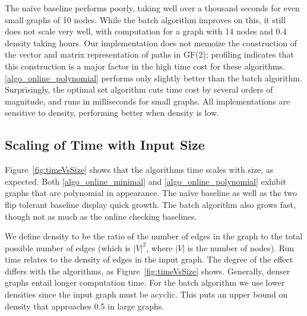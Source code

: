 \documentclass[sigplan,review,nonacm=true]{acmart}
\begin{document}
{The na\"{i}ve baseline performs poorly, taking well over a thousand seconds for even small graphs of 10 nodes.
While the batch algorithm improves on this, it still does not scale very well, with computation for a graph with 14 nodes and 0.4 density taking hours.
Our implementation does not memoize the construction of the vector and matrix representation of paths in GF(2); profiling indicates that this construction is a major factor in the high time cost for these algorithms.
\ref{algo_online_polynomial} performs only slightly better than the batch algorithm.
Surprisingly, the optimal set algorithm cuts time cost by several orders of magnitude, and runs in milliseconds for small graphs.
All implementations are sensitive to density, performing better when density is low.
    
\subsection{Scaling of Time with Input Size}

Figure~\ref{fig:timeVsSize} shows that the algorithms time scales with size, as expected.
Both \ref{algo_online_minimal} and \ref{algo_online_polynomial} exhibit graphs that are polynomial in appearance.
The na\"{i}ve baseline as well as the two flip tolerant baseline display quick growth.
The batch algorithm also grows fast, though not as much as the online checking baselines.

We define density to be the ratio of the number of edges in the graph to the total possible number of edges (which is $|V|^2$, where $|V|$ is the number of nodes).
Run time relates to the density of edges in the input graph.
The degree of the effect differs with the algorithms, as Figure~\ref{fig:timeVsSize} shows.
Generally, denser graphs entail longer computation time.
For the batch algorithm we use lower densities since the input graph must be acyclic. This puts an upper bound on density that approaches 0.5 in large graphs.

}
\end{document}
